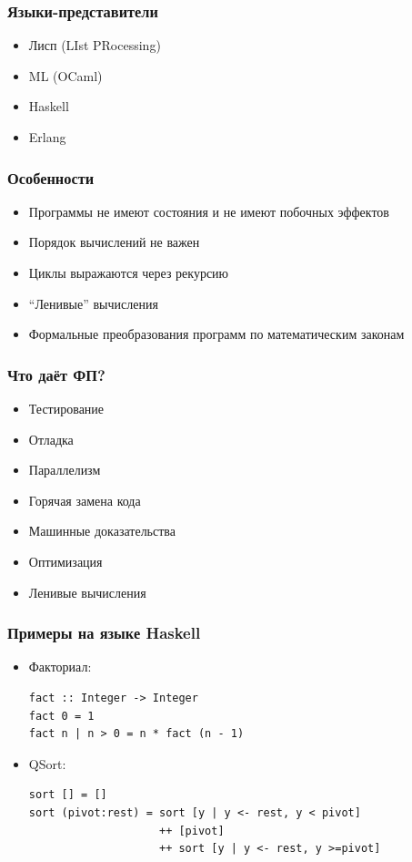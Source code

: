 \documentclass[xetex,mathserif,serif]{beamer}
\begin{document}
	\begin{frame}
		\frametitle{Языки-представители}
		\begin{itemize}
			\item Лисп (LIst PRocessing)
			\item ML (OCaml)
			\item Haskell
			\item Erlang
		\end{itemize}
	\end{frame}

	\begin{frame}
		\frametitle{Особенности}
		\begin{itemize}
			\item Программы не имеют состояния и не имеют побочных эффектов
			\item Порядок вычислений не важен
			\item Циклы выражаются через рекурсию
			\item ``Ленивые'' вычисления
			\item Формальные преобразования программ по математическим законам
		\end{itemize}
	\end{frame}

	\begin{frame}
		\frametitle{Что даёт ФП?}
		\begin{itemize}
			\item Тестирование
			\item Отладка
			\item Параллелизм
			\item Горячая замена кода
			\item Машинные доказательства
			\item Оптимизация
			\item Ленивые вычисления
		\end{itemize}
	\end{frame}

	\begin{frame}[fragile]
		\frametitle{Примеры на языке Haskell}
		\begin{itemize}
			\item Факториал:
			\begin{footnotesize}
				\begin{verbatim}
fact :: Integer -> Integer 
fact 0 = 1 
fact n | n > 0 = n * fact (n - 1)
				\end{verbatim}
			\end{footnotesize}
			\item QSort:
			\begin{footnotesize}
				\begin{verbatim}
sort [] = [] 
sort (pivot:rest) = sort [y | y <- rest, y < pivot] 
                    ++ [pivot]
                    ++ sort [y | y <- rest, y >=pivot]
				\end{verbatim}
			\end{footnotesize}
		\end{itemize}
	\end{frame}
\end{document}
